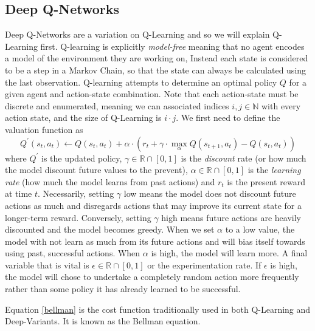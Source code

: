 \documentclass[doc, onecolumn, 12pt]{apa6}
\begin{document}
\subsection{Deep Q-Networks}
Deep Q-Networks are a variation on Q-Learning and so we will explain Q-Learning first. Q-learning is explicitly \emph{model-free} meaning that no agent encodes a model of the environment they are working on, Instead each state is considered to be a step in a Markov Chain, so that the state can always be calculated using the last observation. Q-learning attempts to determine an optimal policy $Q$ for a given agent and action-state combination. Note that each action-state must be discrete and enumerated, meaning we can associated indices $i, j \in \mathbb{N}$ with every action state, and the size of Q-Learning is $i \cdot j$. We first need to define the valuation function as 
\begin{equation} 
\label{bellman}
Q^{\prime}(s_{t}, a_{t}) \leftarrow Q(s_{t}, a_{t}) + \alpha \cdot \left( r_{t} + \gamma \cdot \max_{\alpha} Q(s_{t+1}, a_{t}) - Q(s_{t}, a_{t}) \right)
\end{equation}  where $Q^{\prime}$ is the updated policy, $\gamma \in \mathbb{R} \cap [0,1]$ is the \emph{discount} rate (or how much the model discount future values to the prevent), $\alpha \in \mathbb{R} \cap [0,1]$ is the \emph{learning rate} (how much the model learns from past actions) and $r_{t}$ is the present reward at time $t$.  Necessarily, setting $\gamma$ low means the model does not discount future actions as much and disregards actions that may improve its current state for a longer-term reward. Conversely, setting $\gamma$ high means future actions are heavily discounted and the model becomes greedy. When we set $\alpha$ to a low value, the model with not learn as much from its future actions and will bias itself towards using past, successful actions. When $\alpha$ is high, the model will learn more. A final variable that is vital is $\epsilon \in \mathbb{R} \cap [0,1]$ or the experimentation rate. If $\epsilon$ is high, the model will chose to undertake a completely random action more frequently rather than some policy it has already learned to be successful. 

Equation \eqref{bellman} is the cost function traditionally used in both Q-Learning and Deep-Variants. It is known as the Bellman equation. 
\end{document}
